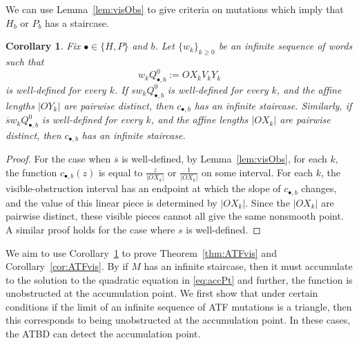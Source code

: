\documentclass[11pt, reqno]{amsart}
\newtheorem{cor}[thm]{Corollary}
\theoremstyle{remark}
\numberwithin{equation}{subsection}
\numberwithin{figure}{section}
\theoremstyle{customremark}
\newcommand{\ov}{\overline}
\begin{document}
We can use Lemma~\ref{lem:visObs} to give criteria on mutations which imply that $H_b$ or $P_b$ has a staircase. 
\begin{cor} \label{cor:visStair}
Fix \(\bullet\in\{H,P\}\) and \(b\). Let \(\{w_k\}_{k\ge0}\) be an infinite
sequence of words such that
\[
        w_kQ_{\bullet,b}^0:=OX_kV_kY_k
\]
is well-defined for every \(k\). If \(sw_kQ_{\bullet,b}^0\) is well-defined for every \(k\), and the affine
lengths \(|OY_k|\) are pairwise distinct, then \(c_{\bullet,b}\) has an infinite staircase. Similarly, if \(\ov{s}w_kQ_{\bullet,b}^0\) is
well-defined for every \(k\), and the affine lengths \(|OX_k|\) are pairwise
distinct, then \(c_{\bullet,b}\) has an infinite staircase.
\end{cor}
\begin{proof}
    For the case when $\ov{s}$ is well-defined, by Lemma~\ref{lem:visObs}, for each $k,$ the function $c_{\bullet,b}(z)$ 
    is equal to $\frac{z}{|OX_k|}$ or $\frac{1}{|OX_k|}$ on some interval. 
    For each \(k\), the visible-obstruction interval has an endpoint at which the slope of \(c_{\bullet,b}\) changes, and the value of this linear piece is determined by \(|OX_k|\). Since the \(|OX_k|\) are pairwise distinct, these visible pieces cannot all give the same nonsmooth point. A similar proof holds for the case where $s$ is well-defined. 
\end{proof}


We aim to use Corollary~\ref{cor:visStair} to prove Theorem~\ref{thm:ATFvis} and Corollary~\ref{cor:ATFvis}. By \cite[Theorem 1.13]{AADT} if $M$ has an infinite staircase, then it must accumulate to the solution to the quadratic equation in \eqref{eq:accPt} and further, the function is unobstructed at the accumulation point. We first show that under certain conditions if the limit of an infinite sequence of ATF mutations is a triangle, then this corresponds to being unobstructed at the accumulation point. In these cases, the ATBD can detect the accumulation point. 
\end{document}

